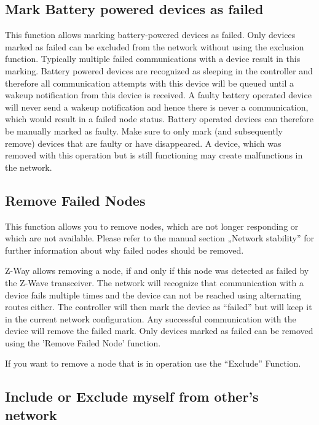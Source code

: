 \subsection{Mark Battery powered devices as failed}

This function allows marking battery-powered devices as failed. Only devices marked as failed can 
be excluded from the network without using the exclusion function. Typically multiple failed 
communications with a device result in this marking. Battery powered devices are recognized as 
sleeping in the controller and therefore all communication attempts with this device will be 
queued until a wakeup notification from this device is received. A faulty battery operated device 
will never send a wakeup notification and hence there is never a communication, which would result 
in a failed node status. Battery operated devices can therefore be manually marked as faulty.  
Make sure to only mark (and subsequently remove) devices that are faulty or have disappeared. 
A device, which was removed with this operation but is still functioning may create malfunctions 
in the network.

\subsection{Remove Failed Nodes}

This function allows you to remove nodes, which are not longer responding or which are not 
available. Please refer to the manual section „Network stability” for further information about 
why failed nodes should be removed.

Z-Way allows removing a node, if and only if this node was detected as failed by the Z-Wave 
transceiver. The network will recognize that communication with a device fails multiple times 
and the device can not be reached using alternating routes either. The controller will then mark 
the device as “failed” but will keep it in the current network configuration.  Any successful 
communication with the device will remove the failed mark. Only devices marked as failed can 
be removed using the 'Remove Failed Node' function.

If you want to remove a node that is in operation use the “Exclude” Function.

\subsection{Include or Exclude myself from other's  network}


